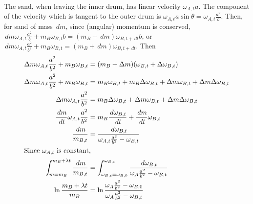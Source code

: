 \documentclass{esg8012pset}
\renewcommand{\d}{\,d}
\begin{document}
\begin{solution}
  \begin{center}
  \end{center}
  The sand, when leaving the inner drum, has linear velocity $\omega_{A,t}a$.  The component of the velocity which is tangent to the outer drum is $\omega_{A,t}a\sin\theta = \omega_{A,t}\frac{a^2}{b}$.  Then, for sand of mass $\d m$, since (angular) momentum is conserved, $\d m \omega_{A,t}\frac{a^2}{b} + m_B \omega_{B,t} b = (m_B + \d m)\omega_{B,t+\d t}b$, or $\d m \omega_{A,t}\frac{a^2}{b^2} + m_B \omega_{B,t} = (m_B + \d m)\omega_{B,t+\d t}$.  Then \begin{align*}
  \Delta m \omega_{A,t}\frac{a^2}{b^2} + m_B \omega_{B,t} & = (m_B + \Delta m)(\omega_{B,t} + \Delta \omega_{B, t}) \\
  \Delta m \omega_{A,t}\frac{a^2}{b^2} + m_B \omega_{B,t} & = m_B \omega_{B,t} + m_B \Delta \omega_{B, t} + \Delta m \omega_{B,t} + \Delta m \Delta \omega_{B, t} \\
  \Delta m \omega_{A,t}\frac{a^2}{b^2} & = m_B \Delta \omega_{B, t} + \Delta m \omega_{B,t} + \Delta m \Delta \omega_{B, t} \\
  \frac{\d m}{\d t} \omega_{A,t}\frac{a^2}{b^2} & = m_B \frac{\d \omega_{B, t}}{\d t} + \frac{\d m}{\d t} \omega_{B,t} \\
  \frac{\d m}{m_{B, t}} & = \frac{\d \omega_{B, t}}{\omega_{A,t}\frac{a^2}{b^2} - \omega_{B,t}} \\
  \intertext{Since $\omega_{A, t}$ is constant,}
  \int_{m = m_B}^{m_B + \lambda t}\frac{\d m}{m_{B, t}} & = \int_{\omega_{B, t} = \omega_{B, 0}}^{\omega_{B, t}}\frac{\d \omega_{B, t}}{\omega_A\frac{a^2}{b^2} - \omega_{B,t}} \\
  \ln\frac{m_B + \lambda t}{m_B} & = \ln\frac{\omega_A\frac{a^2}{b^2} - \omega_{B,0}}{\omega_A\frac{a^2}{b^2} - \omega_{B,t}} \\

\end{align*}
\end{solution}
\end{document}
